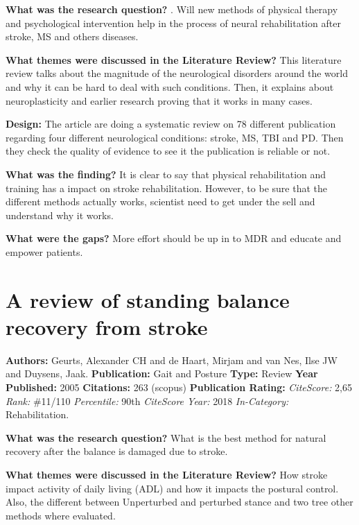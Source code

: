 \textbf{What was the research question?} . 
Will new methods of physical therapy and psychological intervention help in the process of neural rehabilitation after stroke, MS and others diseases. 

\textbf{What themes were discussed in the Literature Review?} 
This literature review talks about the magnitude of the neurological disorders around the world and why it can be hard to deal with such conditions. Then, it explains about neuroplasticity and earlier research proving that it works in many cases. 

\textbf{Design:} 
The article are doing a systematic review on 78 different publication regarding four different neurological conditions: stroke, MS, TBI and PD. Then they check the quality of evidence to see it the publication is reliable or not. 

\textbf{What was the finding?} 
It is clear to say that physical rehabilitation and training has a impact on stroke rehabilitation. However, to be sure that the different methods actually works, scientist need to get under the sell and understand why it works. 

\textbf{What were the gaps?}   
More effort should be up in to MDR and educate and empower patients.
 

\section{A review of standing balance recovery from stroke} 
\textbf{Authors:} Geurts, Alexander CH and de Haart, Mirjam and van Nes, Ilse JW and Duysens, Jaak. 
\textbf{Publication:} Gait and Posture
\textbf{Type:} Review \newline
\textbf{Year Published:} 2005
\textbf{Citations:} 263 (scopus) \newline 
\textbf{Publication Rating:}    
\textit{CiteScore:} 2,65  \textit{Rank:} \#11/110  \textit{Percentile:} 90th  \newline
\textit{CiteScore Year:} 2018
\textit{In-Category:} Rehabilitation.

\textbf{What was the research question?} 
What is the best method for natural recovery after the balance is damaged due to stroke. 

\textbf{What themes were discussed in the Literature Review?}    
How stroke impact activity of daily living (ADL) and how it impacts the postural control. Also, the different between Unperturbed and perturbed stance and two tree other methods where evaluated. 

